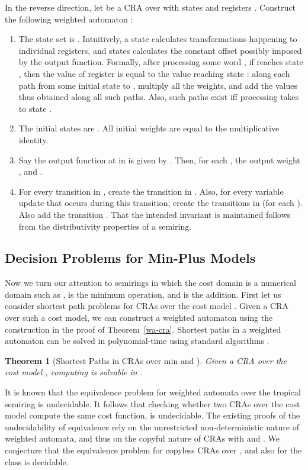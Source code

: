 \documentclass[11pt]{article}
\newtheorem{theorem}{Theorem}
\def\qed{{\bf }}
\newcommand{\mypar}[1]{\subsection{#1}}
\def\qed{{\bf }}
\begin{document}
In the reverse direction, let  be a CRA over 
with states  and registers . Construct the following weighted
automaton :
\begin{enumerate}
\item The state set  is . Intuitively, a state 
calculates transformations happening to individual registers, and
states  calculates the constant offset possibly imposed by
the output function. Formally, after processing some word , if
 reaches state , then the value of register  is equal
to the value reaching state : along each path from
some initial state to , multiply all the weights,
and add the values thus obtained along all such paths. Also, such
paths exist iff processing  takes  to state .
\item The initial states are .
All initial weights are equal to the multiplicative identity.
\item Say the output function at  in  is given by .
Then, for each , the output weight ,
and .
\item For every transition  in , create the transition
 in . Also, for every variable update 
that occurs during this transition, create the transitions 
in  (for each ). Also add the transition .
That the intended invariant is maintained follows from the distributivity
properties of a semiring.\end{enumerate}
\qed


\mypar{Decision Problems for Min-Plus Models}
Now we turn our attention to semirings in which the cost domain
is a numerical domain such as ,  is the minimum operation, and  is the addition.
First let us consider shortest path problems for CRAs over the cost model .
Given a CRA over such a cost model, we can construct a weighted automaton using the construction
in the proof of Theorem~\ref{wa-cra}.
Shortest paths in a weighted automaton can be solved in polynomial-time using standard algorithms \cite{mohri_weighted_2009}.

\begin{theorem}[Shortest Paths in CRAs over min and ]
Given a CRA  over the cost model , computing 
is solvable in .
\end{theorem}

It is known that the equivalence problem for weighted automata over the tropical semiring
is undecidable.
It follows that checking whether two CRAs over the cost model  compute the same cost function,
is undecidable.
The existing proofs of the undecidability of equivalence rely
on the unrestricted non-deterministic nature of weighted automata, and thus on
the copyful nature of CRAs with  and .
We conjecture that the equivalence problem for copyless CRAs over ,
and also for the class  is decidable.
\end{document}
